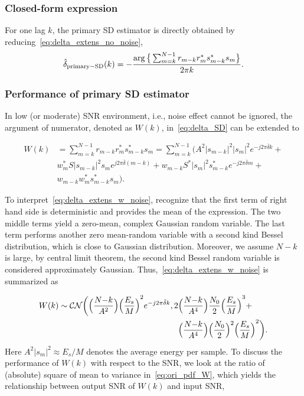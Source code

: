 \subsubsection{Closed-form expression} 
For one lag $k$, the primary SD estimator is directly obtained by reducing~\eqref{eq:delta_extens_no_noise},
\begin{equation}
    \label{eq:delta_SD}
    \hat{\delta}_{\text{primary}-\text{SD}}(k)=-\frac{\arg\big\{\sum_{m=k}^{N-1}r_{m-k}r_m^*s_{m-k}^*s_m\big\}}{2\pi k}.
\end{equation}

\subsubsection{Performance of primary SD estimator}
In low (or moderate) SNR environment, i.e., noise effect cannot be ignored, the argument of numerator, denoted as $W(k)$, in~\eqref{eq:delta_SD} can be extended to 

\begin{equation}
  \label{eq:delta_extens_w_noise}
  \begin{aligned}
    W(k)&=\sum_{m=k}^{N-1}r_{m-k}r_m^*s_{m-k}^*s_m= \sum_{m=k}^{N-1} \Big( A^2|s_{m-k}|^2|s_m|^2e^{-j2\pi \bar{\delta} k} + \\
    &w_m^* S|s_{m-k}|^2s_m e^{j2\pi \bar{\delta}(m-k)} + w_{m-k}S^*|s_m|^2s_{m-k}^* e^{-j2\pi \bar{\delta} m} + \\
    &w_{m-k}w_m^*s_{m-k}^*s_m \Big) .
  \end{aligned}
\end{equation}

To interpret~\eqref{eq:delta_extens_w_noise}, recognize that the first term of right hand side is
deterministic and provides the mean of the expression. The two middle terms yield a zero-mean, complex Gaussian random variable. 
The last term performs another zero mean-random variable with a second kind Bessel distribution, which is close to Gaussian distribution. Moreover, we assume
$N{-}k$ is large, by central limit theorem, the second kind Bessel random variable is considered approximately Gaussian.      
Thus,~\eqref{eq:delta_extens_w_noise} is summarized as

\begin{equation}
  \begin{aligned}
    \label{eq:ori_pdf_W}
    W(k) \sim \mathcal{CN}\bigg(\Big(
    \frac{N{-}k}{A^2}\Big){\Big(\frac{E_s}{M}\Big)}^2e^{-j2\pi \bar{\delta} k},
    2&\Big(\frac{N{-}k}{A^4}\Big)\frac{N_0}{2}{\Big(\frac{E_s}{M}\Big)}^3+ \\
    &\Big(\frac{N{-}k}{A^4}\Big)\Big(\frac{N_0}{2}\Big)^2{\Big(\frac{E_s}{M}\Big)}^2\bigg).
  \end{aligned}
\end{equation}
Here $A^2|s_m|^2 {\approx} E_s/M$ denotes the average energy per
sample. To discuss the performance of $W(k)$ with respect to the SNR, we look at the ratio of 
(absolute) square of mean to variance in~\eqref{eq:ori_pdf_W}, which yields the relationship between
output SNR of $W(k)$ and input SNR,

